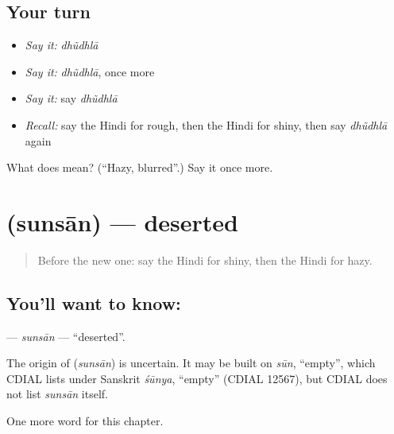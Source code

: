 \subsection*{Your turn}
\begin{itemize}
\raggedright
  \item \emph{Say it:} \emph{dhũdhlā}
  \item \emph{Say it:} \emph{dhũdhlā}, once more
  \item \emph{Say it:} say \emph{dhũdhlā}
  \item \emph{Recall:} say the Hindi for rough, then the Hindi for shiny, then say \emph{dhũdhlā} again
\end{itemize}

\begin{tcolorbox}[breakable,colback=teal!4,colframe=teal!35!black,title={Before you move on}]
What does  mean? (\textquotedblleft{}Hazy, blurred\textquotedblright{}.) Say it once more.
\end{tcolorbox}
\section[\texorpdfstring{\hi{सुनसान} (sunsān)}{सुनसान (sunsān)}]{ (sunsān) — deserted}

\label{lesson:HI-C239-sunsan}



\begin{quote}
Before the new one: say the Hindi for shiny, then the Hindi for hazy.
\end{quote}

\subsection*{You'll want to know: }
\textbf{} — \emph{sunsān} — \textquotedblleft{}deserted\textquotedblright{}.

\begin{cousinweb}
The origin of \textbf{} (\emph{sunsān}) is uncertain. It may be built on \emph{sūn}, \textquotedblleft{}empty\textquotedblright{}, which CDIAL lists under Sanskrit \emph{śūnya}, \textquotedblleft{}empty\textquotedblright{} (CDIAL 12567), but CDIAL does not list \emph{sunsān} itself.
\end{cousinweb}

\begin{grammarlens}[title={What you've built}]
One more word for this chapter.
\end{grammarlens}

